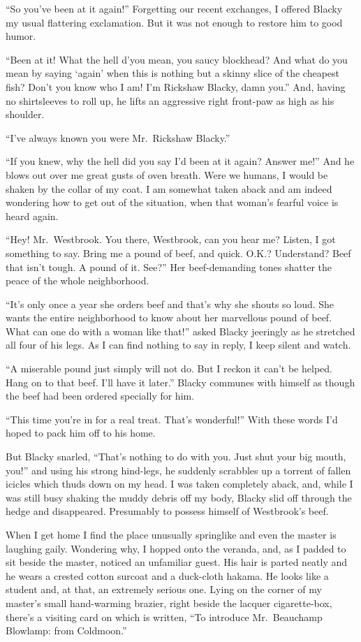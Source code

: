 \documentclass{book}
\begin{document}
``So you've been at it again!'' Forgetting our recent exchanges, I
offered Blacky my usual flattering exclamation. But it was not enough to
restore him to good humor.

``Been at it! What the hell d'you mean, you saucy blockhead? And what do
you mean by saying `again' when this is nothing but a skinny slice of
the cheapest fish? Don't you know who I am! I'm Rickshaw Blacky, damn
you.'' And, having no shirtsleeves to roll up, he lifts an aggressive
right front-paw as high as his shoulder.

``I've always known you were Mr.~Rickshaw Blacky.''

``If you knew, why the hell did you say I'd been at it again? Answer
me!'' And he blows out over me great gusts of oven breath. Were we
humans, I would be shaken by the collar of my coat. I am somewhat taken
aback and am indeed wondering how to get out of the situation, when that
woman's fearful voice is heard again.

``Hey! Mr.~Westbrook. You there, Westbrook, can you hear me? Listen, I
got something to say. Bring me a pound of beef, and quick. O.K.?
Understand? Beef that isn't tough. A pound of it. See?'' Her
beef-demanding tones shatter the peace of the whole neighborhood.

``It's only once a year she orders beef and that's why she shouts so
loud. She wants the entire neighborhood to know about her marvellous
pound of beef. What can one do with a woman like that!'' asked Blacky
jeeringly as he stretched all four of his legs. As I can find nothing to
say in reply, I keep silent and watch.

``A miserable pound just simply will not do. But I reckon it can't be
helped. Hang on to that beef. I'll have it later.'' Blacky communes with
himself as though the beef had been ordered specially for him.

``This time you're in for a real treat. That's wonderful!'' With these
words I'd hoped to pack him off to his home.

But Blacky snarled, ``That's nothing to do with you. Just shut your big
mouth, you!'' and using his strong hind-legs, he suddenly scrabbles up a
torrent of fallen icicles which thuds down on my head. I was taken
completely aback, and, while I was still busy shaking the muddy debris
off my body, Blacky slid off through the hedge and disappeared.
Presumably to possess himself of Westbrook's beef.

When I get home I find the place unusually springlike and even the
master is laughing gaily. Wondering why, I hopped onto the veranda, and,
as I padded to sit beside the master, noticed an unfamiliar guest. His
hair is parted neatly and he wears a crested cotton surcoat and a
duck-cloth hakama. He looks like a student and, at that, an extremely
serious one. Lying on the corner of my master's small hand-warming
brazier, right beside the lacquer cigarette-box, there's a visiting card
on which is written, ``To introduce Mr.~Beauchamp Blowlamp: from
Coldmoon.''
\end{document}

